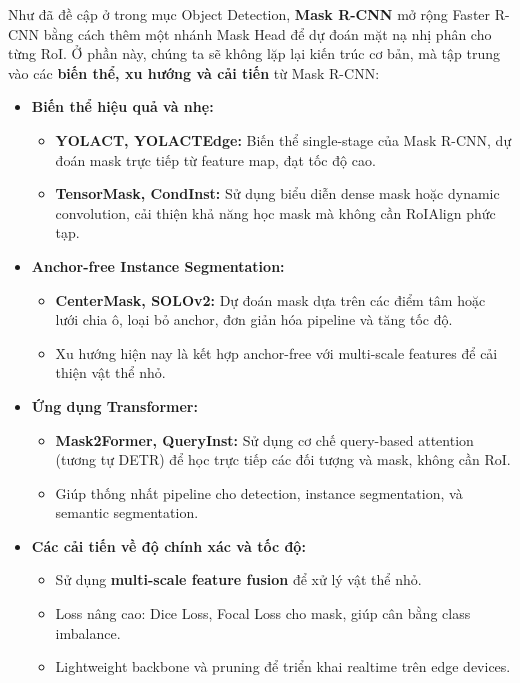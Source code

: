 Như đã đề cập ở trong mục Object Detection, \textbf{Mask R-CNN} \cite{He2017} mở rộng Faster R-CNN bằng cách thêm một nhánh Mask Head để dự đoán mặt nạ nhị phân cho từng RoI. Ở phần này, chúng ta sẽ không lặp lại kiến trúc cơ bản, mà tập trung vào các \textbf{biến thể, xu hướng và cải tiến} từ Mask R-CNN:

\begin{itemize}
	\item \textbf{Biến thể hiệu quả và nhẹ:} 
	\begin{itemize}
		\item \textbf{YOLACT, YOLACTEdge:} Biến thể single-stage của Mask R-CNN, dự đoán mask trực tiếp từ feature map, đạt tốc độ cao.
		\item \textbf{TensorMask, CondInst:} Sử dụng biểu diễn dense mask hoặc dynamic convolution, cải thiện khả năng học mask mà không cần RoIAlign phức tạp.
	\end{itemize}
	
	\item \textbf{Anchor-free Instance Segmentation:}
	\begin{itemize}
		\item \textbf{CenterMask, SOLOv2:} Dự đoán mask dựa trên các điểm tâm hoặc lưới chia ô, loại bỏ anchor, đơn giản hóa pipeline và tăng tốc độ.
		\item Xu hướng hiện nay là kết hợp anchor-free với multi-scale features để cải thiện vật thể nhỏ.
	\end{itemize}
	
	\item \textbf{Ứng dụng Transformer:}
	\begin{itemize}
		\item \textbf{Mask2Former, QueryInst:} Sử dụng cơ chế query-based attention (tương tự DETR) để học trực tiếp các đối tượng và mask, không cần RoI.
		\item Giúp thống nhất pipeline cho detection, instance segmentation, và semantic segmentation.
	\end{itemize}
	
	\item \textbf{Các cải tiến về độ chính xác và tốc độ:}
	\begin{itemize}
		\item Sử dụng \textbf{multi-scale feature fusion} để xử lý vật thể nhỏ.
		\item Loss nâng cao: Dice Loss, Focal Loss cho mask, giúp cân bằng class imbalance.
		\item Lightweight backbone và pruning để triển khai realtime trên edge devices.
	\end{itemize}
\end{itemize}

